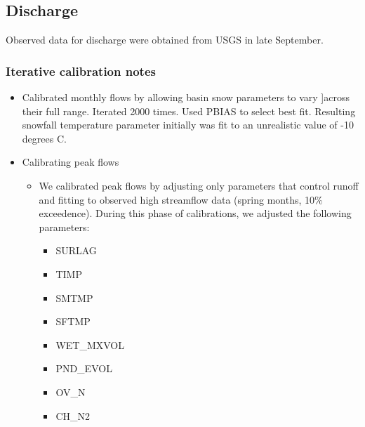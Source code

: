 \subsection{Discharge}
Observed data for discharge were obtained from USGS in late September.

\subsubsection{Iterative calibration notes}
\begin{itemize}
    \item Calibrated monthly flows by allowing basin snow parameters to vary
    ]across their full range. Iterated 2000 times. Used PBIAS to select best
    fit.
    Resulting snowfall temperature parameter initially was fit to an unrealistic
    value of -10 degrees C.
    \item Calibrating peak flows
    \begin{itemize}
        \item We calibrated peak flows by adjusting only parameters that control
        runoff and fitting to observed high streamflow data (spring months,
        10\% exceedence).
        During this phase of calibrations, we adjusted the following parameters:
        \begin{itemize}
            \item SURLAG
            \item TIMP
            \item SMTMP
            \item SFTMP
            \item WET\_MXVOL
            \item PND\_EVOL
            \item OV\_N
            \item CH\_N2


\end{itemize}
\end{itemize}
\end{itemize}
